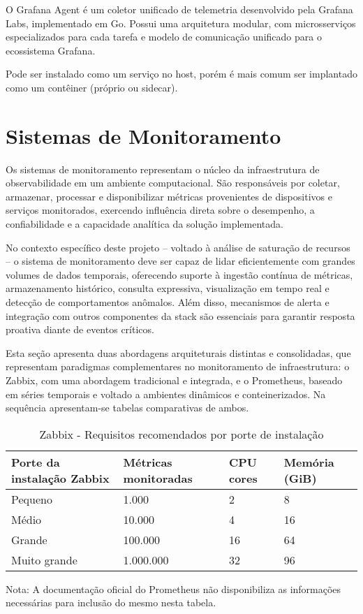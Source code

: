O Grafana Agent \citep{grafanaagent2025} é um coletor unificado de telemetria desenvolvido pela Grafana Labs, implementado em Go. Possui uma arquitetura modular, com microsserviços especializados para cada tarefa e modelo de comunicação  unificado para o ecossistema Grafana.

Pode ser instalado como um serviço no host, porém é mais comum ser implantado como um contêiner (próprio ou sidecar).


\section{Sistemas de Monitoramento}
\label{section:SistemasMonitoramento}

Os sistemas de monitoramento representam o núcleo da infraestrutura de observabilidade em um ambiente computacional. São responsáveis por coletar, armazenar, processar e disponibilizar métricas provenientes de dispositivos e serviços monitorados, exercendo influência direta sobre o desempenho, a confiabilidade e a capacidade analítica da solução implementada.

No contexto específico deste projeto -- voltado à análise de saturação de recursos -- o sistema de monitoramento deve ser capaz de lidar eficientemente com grandes volumes de dados temporais, oferecendo suporte à ingestão contínua de métricas, armazenamento histórico, consulta expressiva, visualização em tempo real e detecção de comportamentos anômalos. Além disso, mecanismos de alerta e integração com outros componentes da stack são essenciais para garantir resposta proativa diante de eventos críticos.

Esta seção apresenta duas abordagens arquiteturais distintas e consolidadas, que representam paradigmas complementares no monitoramento de infraestrutura: o Zabbix, com uma abordagem tradicional e integrada, e o Prometheus, baseado em séries temporais e voltado a ambientes dinâmicos e conteinerizados. Na sequência apresentam-se tabelas comparativas de ambos.

\begin{table}[H]
\centering
\caption{Zabbix - Requisitos recomendados por porte de instalação}
\label{tab:requisitos-zabbix}
\renewcommand{\arraystretch}{1.15}
\begin{tabularx}{\textwidth}{@{}p{4cm} X X X@{}}
\toprule
\textbf{Porte da instalação Zabbix} & \textbf{Métricas monitoradas} & \textbf{CPU cores} & \textbf{Memória (GiB)} \\
\midrule
Pequeno     & 1.000       & 2   & 8   \\
Médio       & 10.000      & 4   & 16  \\
Grande       & 100.000     & 16  & 64  \\
Muito grande & 1.000.000 & 32  & 96  \\
\bottomrule
\end{tabularx}
\begin{flushleft}
\footnotesize
Nota: A documentação oficial do Prometheus não disponibiliza as informações necessárias para inclusão do mesmo nesta tabela.
\end{flushleft}
\end{table}



